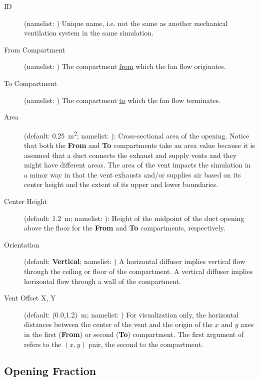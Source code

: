 {{\begin{description}
\item[ID] (namelist: )  Unique name, i.e. not the same as another mechanical ventilation system in the same simulation.
\item[From Compartment] (namelist: ) The compartment \underline{from} which the fan flow originates.
\item[To Compartment] (namelist: ) The compartment \underline{to} which the fan flow terminates.
\item[Area] (default: 0.25~\unit{m^2}; namelist: ): Cross-sectional area of the opening. Notice that both the \textbf{From} and \textbf{To} compartments take an area value because it is assumed that a duct connects the exhaust and supply vents and they might have different areas. The area of the vent impacts the simulation in a minor way in that the vent exhausts and/or supplies air based on its center height and the extent of its upper and lower boundaries.
\item[Center Height] (default: 1.2~m; namelist: ): Height of the midpoint of the duct opening above the floor for the \textbf{From} and \textbf{To} compartments, respectively.
\item[Orientation] (default: \textbf{Vertical}; namelist: ) A horizontal diffuser implies vertical flow through the ceiling or floor of the compartment.  A vertical diffuser implies horizontal flow through a wall of the compartment.
\item[Vent Offset X, Y] (default: (0.0,1.2)~m; namelist: ) For visualization only, the horizontal distances between the center of the vent and the origin of the $x$ and $y$ axes in the first (\textbf{From}) or second (\textbf{To}) compartment. The first argument of  refers to the $(x,y)$ pair, the second to the compartment.
\end{description}

\subsection{Opening Fraction}
\label{info:VENT3b}

}}
